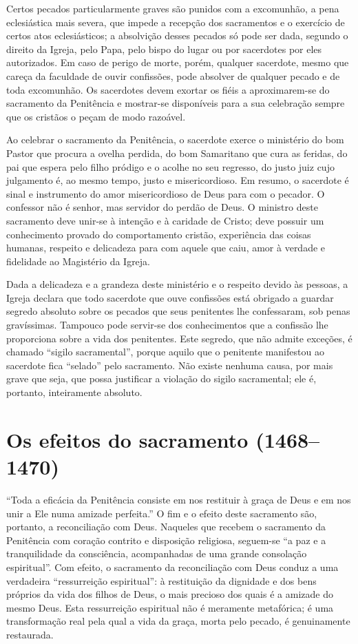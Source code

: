 Certos pecados particularmente graves são punidos com a excomunhão, a pena eclesiástica mais severa, que impede a recepção dos sacramentos e o exercício de certos atos eclesiásticos; a absolvição desses pecados só pode ser dada, segundo o direito da Igreja, pelo Papa, pelo bispo do lugar ou por sacerdotes por eles autorizados. Em caso de perigo de morte, porém, qualquer sacerdote, mesmo que careça da faculdade de ouvir confissões, pode absolver de qualquer pecado e de toda excomunhão. Os sacerdotes devem exortar os fiéis a aproximarem-se do sacramento da Penitência e mostrar-se disponíveis para a sua celebração sempre que os cristãos o peçam de modo razoável.

Ao celebrar o sacramento da Penitência, o sacerdote exerce o ministério do bom Pastor que procura a ovelha perdida, do bom Samaritano que cura as feridas, do pai que espera pelo filho pródigo e o acolhe no seu regresso, do justo juiz cujo julgamento é, ao mesmo tempo, justo e misericordioso. Em resumo, o sacerdote é sinal e instrumento do amor misericordioso de Deus para com o pecador. O confessor não é senhor, mas servidor do perdão de Deus. O ministro deste sacramento deve unir-se à intenção e à caridade de Cristo; deve possuir um conhecimento provado do comportamento cristão, experiência das coisas humanas, respeito e delicadeza para com aquele que caiu, amor à verdade e fidelidade ao Magistério da Igreja.

Dada a delicadeza e a grandeza deste ministério e o respeito devido às pessoas, a Igreja declara que todo sacerdote que ouve confissões está obrigado a guardar segredo absoluto sobre os pecados que seus penitentes lhe confessaram, sob penas gravíssimas. Tampouco pode servir-se dos conhecimentos que a confissão lhe proporciona sobre a vida dos penitentes. Este segredo, que não admite exceções, é chamado ``sigilo sacramental'', porque aquilo que o penitente manifestou ao sacerdote fica ``selado'' pelo sacramento. Não existe nenhuma causa, por mais grave que seja, que possa justificar a violação do sigilo sacramental; ele é, portanto, inteiramente absoluto.

\section{Os efeitos do sacramento (1468--1470)}

``Toda a eficácia da Penitência consiste em nos restituir à graça de Deus e em nos unir a Ele numa amizade perfeita.'' O fim e o efeito deste sacramento são, portanto, a reconciliação com Deus. Naqueles que recebem o sacramento da Penitência com coração contrito e disposição religiosa, seguem-se ``a paz e a tranquilidade da consciência, acompanhadas de uma grande consolação espiritual''. Com efeito, o sacramento da reconciliação com Deus conduz a uma verdadeira ``ressurreição espiritual'': à restituição da dignidade e dos bens próprios da vida dos filhos de Deus, o mais precioso dos quais é a amizade do mesmo Deus. Esta ressurreição espiritual não é meramente metafórica; é uma transformação real pela qual a vida da graça, morta pelo pecado, é genuinamente restaurada.

